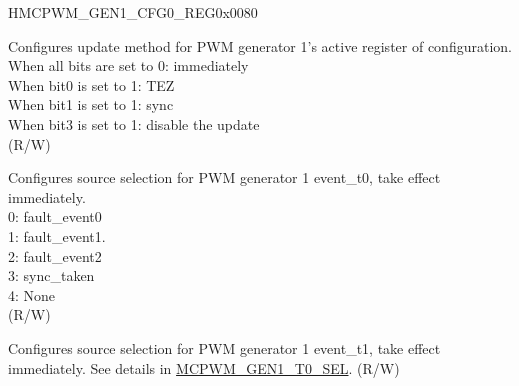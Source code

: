 \begin{register}{H}{MCPWM\_GEN1\_CFG0\_REG}{0x0080}\label{regdesc:MCPWMGEN1CFG0REG}
%
%
%
%
\regnewline%
\begin{regdesc}\begin{reglist}
\label{fielddesc:MCPWMGEN1CFGUPMETHOD}\item [MCPWM\_GEN1\_CFG\_UPMETHOD] Configures update method for PWM generator 1's active register of configuration.
\\When all bits are set to 0: immediately
\\When bit0 is set to 1: TEZ
\\When bit1 is set to 1: sync
\\When bit3 is set to 1: disable the update
\\(R/W)
\label{fielddesc:MCPWMGEN1T0SEL}\item [MCPWM\_GEN1\_T0\_SEL] Configures source selection for PWM generator 1 event\_t0, take effect immediately. \\0: fault\_event0 \\1: fault\_event1. \\2: fault\_event2 \\3: sync\_taken \\4: None \\(R/W)
\label{fielddesc:MCPWMGEN1T1SEL}\item [MCPWM\_GEN1\_T1\_SEL] Configures source selection for PWM generator 1 event\_t1, take effect immediately. See details in \hyperref[fielddesc:MCPWMGEN1T0SEL]{MCPWM\_GEN1\_T0\_SEL}. (R/W)
\end{reglist}\end{regdesc}
\end{register}


